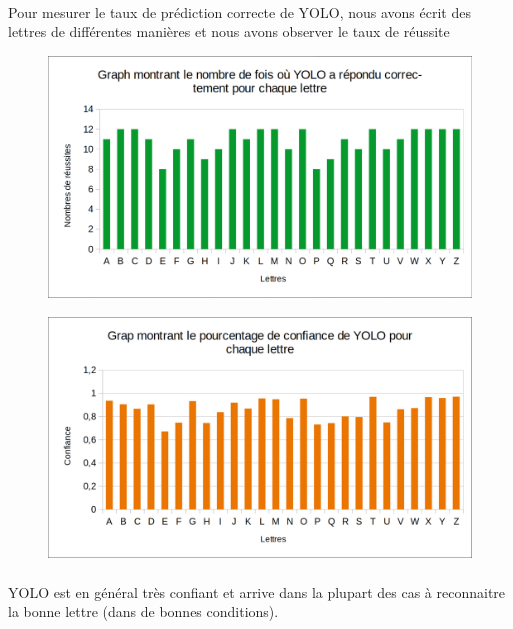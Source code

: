 \documentclass[a4paper]{article}
\begin{document}
			\paragraph{} Pour mesurer le taux de prédiction correcte de YOLO, nous avons écrit des lettres de différentes manières et nous avons observer le taux de réussite
			\begin{figure}[H]
				\caption{}
				\includegraphics[width=\textwidth]{grapYoloReussite.png}
				\centering
				\label{fig:graph:reussite}
			\end{figure}
			\begin{figure}[H]
				\caption{}
				\includegraphics[width=\textwidth]{grapYoloConfiance.png}
				\centering
				\label{fig:graph:confiance}
			\end{figure}
			\paragraph{} YOLO est en général très confiant et arrive dans la plupart des cas à reconnaitre la bonne lettre (dans de bonnes conditions).
		
\end{document}

